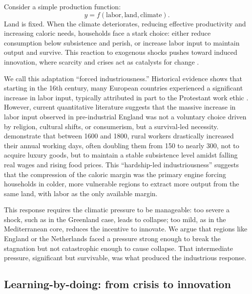 \documentclass[11pt,a4paper]{article}
\begin{document}
Consider a simple production function:
\[
  y = f(\text{labor}, \text{land}, \text{climate}).
\]
Land is fixed. When the climate deteriorates, reducing effective productivity and increasing caloric needs, households face a stark choice: either reduce consumption below subsistence and perish, or increase labor input to maintain output and survive. This reaction to exogenous shocks pushes toward induced innovation, where scarcity and crises act as catalysts for change \parencite{Hicks1932, Boserup1965}.

We call this adaptation ``forced industriousness.''
Historical evidence shows that starting in the 16th century, many European countries experienced a significant increase in labor input, typically attributed in part to the Protestant work ethic \parencite{Weber1905}. However, current quantitative literature suggests that the massive increase in labor input observed in pre-industrial England was not a voluntary choice driven by religion, cultural shifts, or consumerism, but a survival-led necessity. \textcite{AllenWeisdorf2011} demonstrate that between 1600 and 1800, rural workers drastically increased their annual working days, often doubling them from 150 to nearly 300, not to acquire luxury goods, but to maintain a stable subsistence level amidst falling real wages and rising food prices. This ``hardship-led industriousness'' \parencite{HumphriesWeisdorf2019} suggests that the compression of the caloric margin was the primary engine forcing households in colder, more vulnerable regions to extract more output from the same land, with labor as the only available margin.

This response requires the climatic pressure to be manageable: too severe a shock, such as in the Greenland case, leads to collapse; too mild, as in the Mediterranean core, reduces the incentive to innovate. We argue that regions like England or the Netherlands faced a pressure strong enough to break the stagnation but not catastrophic enough to cause collapse. That intermediate pressure, significant but survivable, was what produced the industrious response.

\subsection*{Learning-by-doing: from crisis to innovation}
\end{document}
